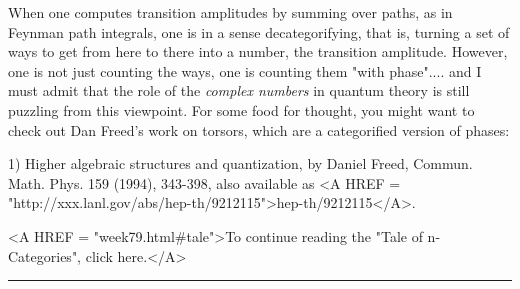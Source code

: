 When one computes transition amplitudes by summing over paths, as in
Feynman path integrals, one is in a sense decategorifying, that is,
turning a set of ways to get from here to there into a number, the
transition amplitude.  However, one is not just counting the ways, one
is counting them "with phase".... and I must admit that the
role of the \emph{complex numbers} in quantum theory is still puzzling
from this viewpoint.  For some food for thought, you might want to check
out Dan Freed's work on torsors, which are a categorified version of
phases:

1) Higher algebraic structures and quantization, by Daniel Freed,
Commun. Math. Phys. 159 (1994), 343-398, also available as
<A HREF = "http://xxx.lanl.gov/abs/hep-th/9212115">hep-th/9212115</A>. 





<A HREF = "week79.html#tale">To continue reading the "Tale of
n-Categories", click here.</A>


\par\noindent\rule{\textwidth}{0.4pt}


